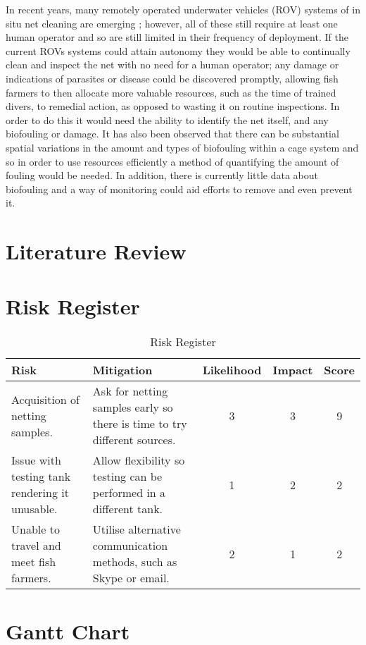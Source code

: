 \documentclass[11.5pt, twoside, a4paper]{article}
\begin{document}
In recent years, many remotely operated underwater vehicles (ROV) systems of in situ net cleaning are emerging \cite{AKVA, MIC, Yanmar}; however, all of these still require at least one human operator and so are still limited in their frequency of deployment. If the current ROVs systems could attain autonomy they would be able to continually clean and inspect the net with no need for a human operator; any damage or indications of parasites or disease could be discovered promptly, allowing fish farmers to then allocate more valuable resources, such as the time of trained divers, to remedial action, as opposed to wasting it on routine inspections. In order to do this it would need the ability to identify the net itself, and any biofouling or damage.  It has also been observed that there can be substantial spatial variations in the amount and types of biofouling within a cage system \cite{fitridge2012impact,hodson1997biofouling} and so in order to use resources efficiently a method of quantifying the amount of fouling would be needed. In addition, there is currently little data about biofouling and a way of monitoring could aid efforts to remove and even prevent it.

\section{Literature Review}



\section{Risk Register}

\begin{table}[h]
\centering 
\begin{tabular}{|p{3cm}|p{3.5cm} |c |c| c|} \hline
Risk & Mitigation & Likelihood & Impact & Score \\ [0.5ex] 
\hline 
Acquisition of netting samples. & Ask for netting samples early so there is time to try different sources. & 3 & 3 & 9\\
\hline
Issue with testing tank rendering it unusable. & Allow flexibility so testing can be performed in a different tank. & 1 & 2 & 2\\
\hline
Unable to travel and meet fish farmers. & Utilise alternative communication methods, such as Skype or email. & 2 & 1 & 2\\
\hline
\end{tabular}
\label{table:risks} 
\caption{Risk Register} 
\end{table}


\section{Gantt Chart}


{}
\end{document}
